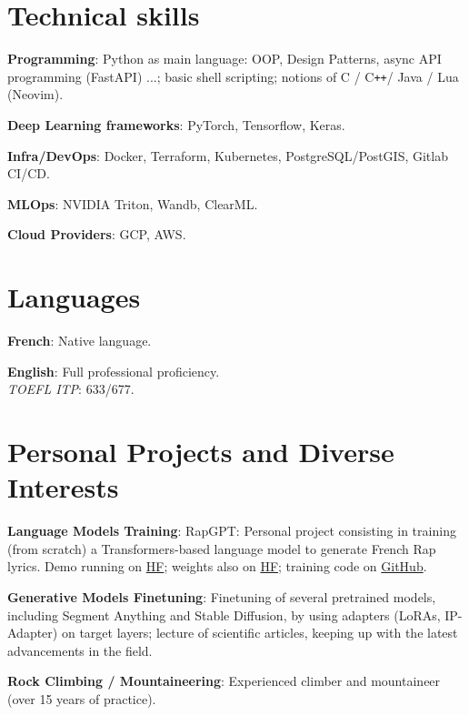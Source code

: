 \documentclass[letterpaper,10pt]{article}
\newcommand{\resumeItem}[2]{
  \item\small{
    \textbf{#1}{: #2\vspace{-0.8pt}}
  }
}
\def\Plus{\texttt{+}}
\newcommand{\resumeSubItem}[2]{
    \small{\resumeItem{#1}{#2}\vspace{-4pt}}
	}
\newcommand{\resumeSubHeadingListStart}{\begin{itemize}[leftmargin=*]}
\newcommand{\resumeSubHeadingListEnd}{\end{itemize}}
\begin{document}
\begin{minipage}[t]{0.65\linewidth}
    \section{Technical skills}
    \resumeSubHeadingListStart
    \resumeSubItem{Programming}{Python as main language: OOP, Design Patterns, async API programming (FastAPI) ...; basic shell scripting; notions of C / C\Plus\Plus / Java / Lua (Neovim).}
    \resumeSubItem{Deep Learning frameworks}{PyTorch, Tensorflow, Keras.}
    \resumeSubItem{Infra/DevOps}{Docker, Terraform, Kubernetes, PostgreSQL/PostGIS, Gitlab CI/CD.}
    \resumeSubItem{MLOps}{NVIDIA Triton, Wandb, ClearML.}
    \resumeSubItem{Cloud Providers}{GCP, AWS.}
    \resumeSubHeadingListEnd
\end{minipage}
\hfill
\begin{minipage}[t]{0.3\linewidth}
    \section{Languages}
    \resumeSubHeadingListStart
    \resumeSubItem{French}{Native language.}
    \resumeSubItem{English}{Full professional proficiency. \\ \emph{TOEFL ITP}: 633/677.}
    \resumeSubHeadingListEnd
\end{minipage}



\section{Personal Projects and Diverse Interests}
\vspace{0.5mm}
\begin{minipage}[t]{0.9865\textwidth}
\resumeSubHeadingListStart
\resumeSubItem{Language Models Training}{RapGPT: Personal project consisting in training (from scratch) a Transformers-based language model to generate French Rap lyrics. 
Demo running on \href{https://huggingface.co/spaces/hugojarkoff/rapGPT}{HF}; weights also on \href{https://huggingface.co/hugojarkoff/rapGPT}{HF}; training code on \href{https://github.com/hugojarkoff/rapGPT}{GitHub}.}
\resumeSubItem{Generative Models Finetuning}{Finetuning of several pretrained models, including Segment Anything and Stable Diffusion, by using adapters (LoRAs, IP-Adapter) on target layers; lecture of scientific articles, keeping up with the latest advancements in the field.}
\resumeSubItem{Rock Climbing / Mountaineering}{Experienced climber and mountaineer (over 15 years of practice).}
\resumeSubHeadingListEnd
\end{minipage}







\end{document}
